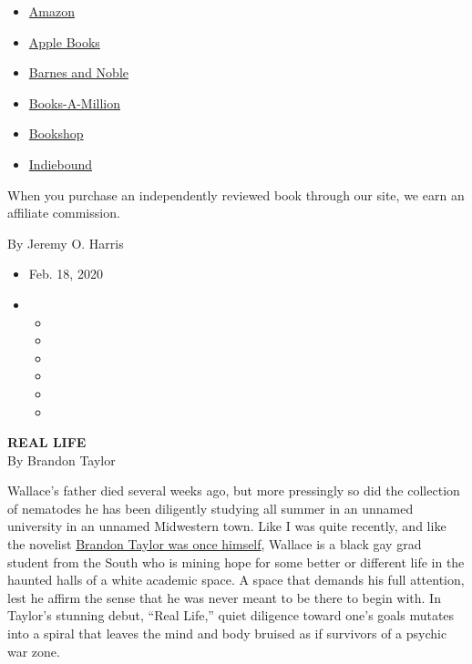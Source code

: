 \begin{itemize}
\tightlist
\item
  \href{https://www.amazon.com/gp/search?index=books\&tag=NYTBSREV-20\&field-keywords=Real+Life+Brandon+Taylor}{Amazon}
\item
  \href{https://du-gae-books-dot-nyt-du-prd.appspot.com/buy?title=Real+Life\&author=Brandon+Taylor}{Apple
  Books}
\item
  \href{https://www.anrdoezrs.net/click-7990613-11819508?url=https\%3A\%2F\%2Fwww.barnesandnoble.com\%2Fw\%2F\%3Fean\%3D9780525538882}{Barnes
  and Noble}
\item
  \href{https://www.anrdoezrs.net/click-7990613-35140?url=https\%3A\%2F\%2Fwww.booksamillion.com\%2Fp\%2FReal\%2BLife\%2FBrandon\%2BTaylor\%2F9780525538882}{Books-A-Million}
\item
  \href{https://bookshop.org/a/3546/9780525538882}{Bookshop}
\item
  \href{https://www.indiebound.org/book/9780525538882?aff=NYT}{Indiebound}
\end{itemize}

When you purchase an independently reviewed book through our site, we
earn an affiliate commission.

By Jeremy O. Harris

\begin{itemize}
\item
  Feb. 18, 2020
\item
  \begin{itemize}
  \item
  \item
  \item
  \item
  \item
  \item
  \end{itemize}
\end{itemize}

\textbf{REAL LIFE}\\
By Brandon Taylor

Wallace's father died several weeks ago, but more pressingly so did the
collection of nematodes he has been diligently studying all summer in an
unnamed university in an unnamed Midwestern town. Like I was quite
recently, and like the novelist
\href{https://www.nytimes3xbfgragh.onion/2020/02/10/books/brandon-taylor-real-life.html}{Brandon
Taylor was once himself}, Wallace is a black gay grad student from the
South who is mining hope for some better or different life in the
haunted halls of a white academic space. A space that demands his full
attention, lest he affirm the sense that he was never meant to be there
to begin with. In Taylor's stunning debut, ``Real Life,'' quiet
diligence toward one's goals mutates into a spiral that leaves the mind
and body bruised as if survivors of a psychic war zone.

